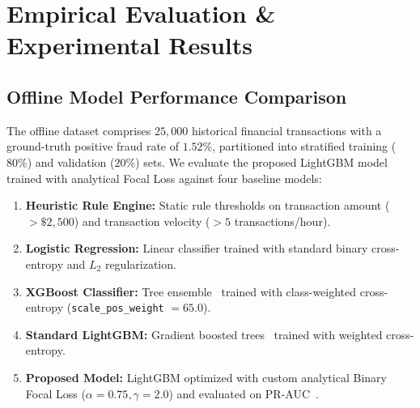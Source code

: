 \section{Empirical Evaluation \& Experimental Results}
\label{sec:experiments}

\subsection{Offline Model Performance Comparison}
The offline dataset comprises $25,000$ historical financial transactions with a ground-truth positive fraud rate of $1.52\%$, partitioned into stratified training ($80\%$) and validation ($20\%$) sets. We evaluate the proposed LightGBM model trained with analytical Focal Loss against four baseline models:
\begin{enumerate}
    \item \textbf{Heuristic Rule Engine:} Static rule thresholds on transaction amount ($> \$2,500$) and transaction velocity ($> 5$ transactions/hour).
    \item \textbf{Logistic Regression:} Linear classifier trained with standard binary cross-entropy and $L_2$ regularization.
    \item \textbf{XGBoost Classifier:} Tree ensemble~\cite{chen2016xgboost} trained with class-weighted cross-entropy (\texttt{scale\_pos\_weight} $= 65.0$).
    \item \textbf{Standard LightGBM:} Gradient boosted trees~\cite{ke2017lightgbm} trained with weighted cross-entropy.
    \item \textbf{Proposed Model:} LightGBM optimized with custom analytical Binary Focal Loss ($\alpha = 0.75, \gamma = 2.0$) and evaluated on PR-AUC~\cite{davis2006relationship}.
\end{enumerate}

